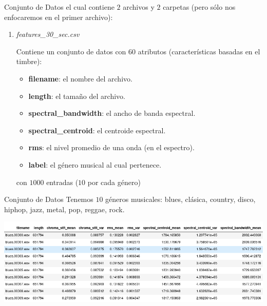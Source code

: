 \documentclass[11pt]{beamer}
\begin{document}
\begin{frame}{Conjunto de Datos}
    \justifying
    el cual contiene $2$ archivos y $2$ carpetas (pero sólo nos enfocaremos en el 
    primer archivo):
    \begin{enumerate}
        \item \textit{features\_30\_sec.csv}

        Contiene un conjunto de datos con $60$ atributos (características
        basadas en el timbre):
        \begin{itemize}
            \item \textbf{filename}: el nombre del archivo.
            \item \textbf{length}:  el tamaño del archivo.
            \item \textbf{spectral\_bandwidth}: el ancho de banda espectral.
            \item \textbf{spectral\_centroid}: el centroide espectral.
            \item \textbf{rms}: el nivel promedio de una onda (en el espectro).
            \item \textbf{label}: el género musical al cual pertenece.
        \end{itemize}

        con $1000$ entradas ($10$ por cada género)
    \end{enumerate}
\end{frame}

\begin{frame}{Conjunto de Datos}
    Tenemos $10$ géneros musicales: blues, clásica, country, disco, hiphop, 
    jazz, metal, pop, reggae, rock.
    \begin{center}
        \includegraphics[width=1\textwidth]{imagenes/dataset.png}
    \end{center}
\end{frame}

\end{document}
